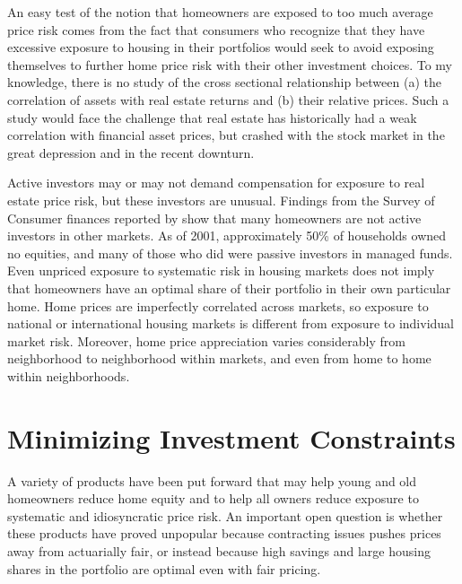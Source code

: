 \documentclass[12pt]{article}
\begin{document}
An easy test of the notion that homeowners are exposed to too much average price
risk comes from the fact that consumers who recognize that they have excessive
exposure to housing in their portfolios would seek to avoid exposing themselves
to further home price risk with their other investment choices.  To my
knowledge, there is no study of the cross sectional relationship between (a) the
correlation of assets with real estate returns and (b) their relative prices.
Such a study would face the challenge that real estate has historically had a
weak correlation with financial asset prices, but crashed with the stock market
in the great depression and in the recent downturn.  

Active investors may or may not demand compensation for exposure to real estate
price risk, but these investors are unusual.  Findings from the Survey of
Consumer finances reported by \citet{AizcorbeKennickellMoore} show that many
homeowners are not active investors in other markets.  As of 2001, approximately
50\% of households owned no equities, and many of those who did were passive
investors in managed funds.  Even unpriced exposure to systematic risk in
housing markets does not imply that homeowners have an optimal share of their
portfolio in their own particular home.  Home prices are imperfectly correlated
across markets, so exposure to national or international housing markets is
different from exposure to individual market risk.  Moreover, home price
appreciation varies considerably from neighborhood to neighborhood within
markets, and even from home to home within neighborhoods.  

\section{Minimizing Investment Constraints}
A variety of products have been put forward that may help young and old
homeowners reduce home equity and to help all owners reduce exposure to
systematic and idiosyncratic price risk.  An important open question is whether
these products have proved unpopular because contracting issues pushes prices
away from actuarially fair, or instead because high savings and large housing
shares in the portfolio are optimal even with fair pricing.
\end{document}
